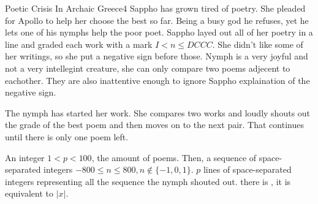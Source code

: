 \begin{task}{Poetic Crisis In Archaic Greece}{4}
Sappho has grown tired of poetry. She pleaded for Apollo to help her choose
the best so far. Being a busy god he refuses, yet he lets one of his nymphs
help the poor poet. Sappho layed out all of her poetry in a line and graded each
work with a mark $I < n \leq DCCC$. She didn't like some of her writings, so she
put a negative sign before those. 
Nymph is a very joyful and not a very intellegint creature, she can only compare
two poems adjecent to eachother. They are also
inattentive enough to ignore Sappho explaination of the negative sign.

The nymph has started her work. She compares two works and loudly shouts
out the grade of the best poem and then moves on to the next pair. That continues
until there is only one poem left.

\In
An integer $1 < p < 100$, the amount of poems. 
Then, a sequence of space-separated integers $-800 \leq n \leq 800, n \nin \{-1, 0, 1\}$.
\Out
$p$ lines of space-separated integers representing all the sequence the nymph shouted out.
\Hint there is , it is equivalent to $|x|$.

\begin{ExampleIO}
\end{ExampleIO}

\end{task}
